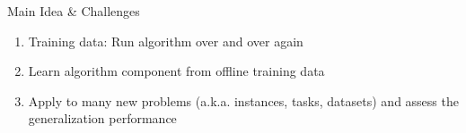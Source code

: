 \begin{frame}[c]{Main Idea \& Challenges}

\begin{enumerate}
	\item \alert{Training data}: Run algorithm over and over again
	\pause
	\smallskip
	\item \alert{Learn} algorithm component from offline training data
	\pause
	\smallskip
	\item Apply to many new problems (a.k.a. instances, tasks, datasets) and assess the \alert{generalization} performance 
\end{enumerate}
	
	
\end{frame}


